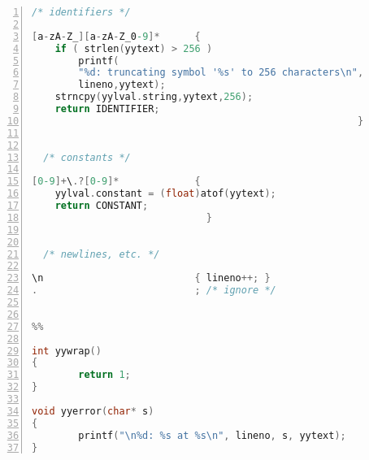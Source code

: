 \documentclass[titlepage,letterpaper]{report}
\begin{document}
\begin{lstlisting}[language=C,caption={hsmc.l (lex source)},numbers=left,columns=fixed]
  /* identifiers */

[a-zA-Z_][a-zA-Z_0-9]*      { 
	if ( strlen(yytext) > 256 ) 
		printf(
		"%d: truncating symbol '%s' to 256 characters\n",
		lineno,yytext); 
	strncpy(yylval.string,yytext,256); 
	return IDENTIFIER;
														}

  
  /* constants */
  
[0-9]+\.?[0-9]*             { 
	yylval.constant = (float)atof(yytext); 
	return CONSTANT; 
	                          }


  /* newlines, etc. */

\n                          { lineno++; }
.                           ; /* ignore */


%%

int yywrap()
{
        return 1;
}

void yyerror(char* s)
{
        printf("\n%d: %s at %s\n", lineno, s, yytext);
}
\end{lstlisting}
\end{document}
